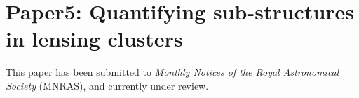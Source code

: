 \chapter{Paper5: Quantifying sub-structures in lensing clusters}\label{paper:substructures}



This paper has been submitted to {\it Monthly Notices of the Royal Astronomical
Society} (MNRAS), and currently under review.


\clearpage
